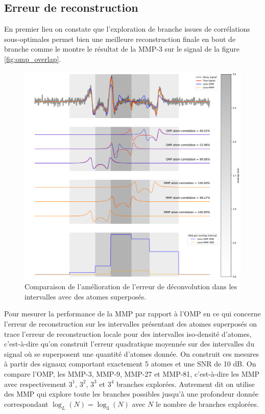 \documentclass[9pt,a4paper,twoside]{rho}
\begin{document}
\subsection{Erreur de reconstruction} 

En premier lieu on constate que l'exploration de branche issues de corrélations sous-optimales permet bien une meilleure reconstruction finale en bout de branche comme le montre le résultat de la MMP-3 sur le signal de la figure \ref{fig:omp_overlap}.

\begin{figure}[H]
    \centering
    \includegraphics[width=1\linewidth]{images/mmp_overlap_decomposition_v2.png}
    \caption{Comparaison de l'amélioration de l'erreur de déconvolution dans les intervalles avec des atomes superposés.}
    \label{fig:comp_deconv}
\end{figure}

Pour mesurer la performance de la MMP par rapport à l'OMP en ce qui concerne l'erreur de reconstruction sur les intervalles présentant des atomes superposés on trace l'erreur de reconstruction locale pour des intervalles iso-densité d'atomes, c'est-à-dire qu'on construit l'erreur quadratique moyennée sur des intervalles du signal où se superposent une quantité d'atomes donnée.
On construit ces mesures à partir des signaux comportant exactement 5 atomes et une SNR de 10 dB.
On compare l'OMP, les MMP-3, MMP-9, MMP-27 et MMP-81, c'est-à-dire les MMP avec respectivement $3^1$, $3^2$, $3^3$ et $3^4$ branches explorées.
Autrement dit on utilise des MMP qui explore toute les branches possibles jusqu'à une profondeur donnée correspondant $\log_L(N) = \log_3(N)$ avec $N$ le nombre de branches explorées.
\end{document}
